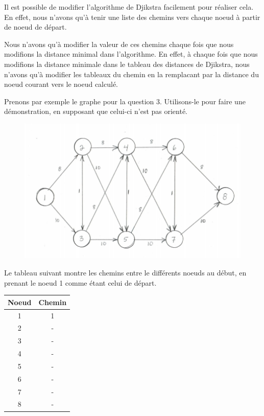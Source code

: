 \documentclass[12pt]{article}
\begin{document}
Il est possible de modifier l'algorithme de Djikstra facilement pour réaliser cela. En effet, nous n'avons qu'à tenir une liste des chemins vers chaque noeud à partir de noeud de départ. \newline

Nous n'avons qu'à modifier la valeur de ces chemins chaque fois que nous modifions la distance minimal dans l'algorithme. En effet, à chaque fois que nous modifions la distance minimale dans le tableau des distances de Djikstra, nous n'avons qu'à modifier les tableaux du chemin en la remplacant par la distance du noeud courant vers le noeud calculé. \newline

Prenons par exemple le graphe pour la question 3. Utilisons-le pour faire une démonstration, en supposant que celui-ci n'est pas orienté.

\begin{figure}[H]
	\centering
	\includegraphics[width=12cm]{figures/q3}
\end{figure}

Le tableau suivant montre les chemins entre le différents noeuds au début, en prenant le noeud 1 comme étant celui de départ.

\begin{center}
 \begin{tabular}{||c c||}
 \hline
 Noeud & Chemin \\ [0.5ex]
 \hline\hline
 1 & 1 \\
 \hline
 2 & - \\
 \hline
 3 & - \\
 \hline
 4 & - \\
 \hline
 5 & -  \\
 \hline
 6 & -  \\
 \hline
 7 & -  \\
 \hline
 8 & -  \\ [1ex]
 \hline
\end{tabular}
\end{center}
\end{document}
